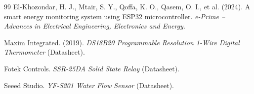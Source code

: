 \documentclass[11pt,a4paper]{article}
\begin{document}
\begin{thebibliography}{99}
El-Khozondar, H. J., Mtair, S. Y., Qoffa, K. O., Qasem, O. I., et al. (2024).
A smart energy monitoring system using ESP32 microcontroller.
\emph{e-Prime -- Advances in Electrical Engineering, Electronics and Energy}.

Maxim Integrated. (2019).
\emph{DS18B20 Programmable Resolution 1-Wire Digital Thermometer} (Datasheet).

Fotek Controls.
\emph{SSR-25DA Solid State Relay} (Datasheet).

Seeed Studio.
\emph{YF-S201 Water Flow Sensor} (Datasheet).

\end{thebibliography}
\end{document}
